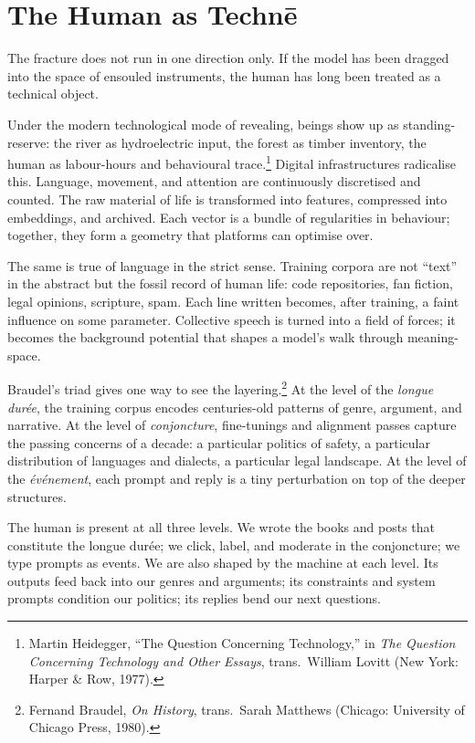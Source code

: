 \documentclass[12pt,a4paper]{article}
\begin{document}
\section{The Human as Techn\={e}}

The fracture does not run in one direction only. If the model has been dragged into the space of ensouled instruments, the human has long been treated as a technical object.

Under the modern technological mode of revealing, beings show up as standing-reserve: the river as hydroelectric input, the forest as timber inventory, the human as labour-hours and behavioural trace.\footnote{Martin Heidegger, ``The Question Concerning Technology,'' in \emph{The Question Concerning Technology and Other Essays}, trans.\ William Lovitt (New York: Harper \& Row, 1977).} Digital infrastructures radicalise this. Language, movement, and attention are continuously discretised and counted. The raw material of life is transformed into features, compressed into embeddings, and archived. Each vector is a bundle of regularities in behaviour; together, they form a geometry that platforms can optimise over.

The same is true of language in the strict sense. Training corpora are not ``text'' in the abstract but the fossil record of human life: code repositories, fan fiction, legal opinions, scripture, spam. Each line written becomes, after training, a faint influence on some parameter. Collective speech is turned into a field of forces; it becomes the background potential that shapes a model's walk through meaning-space.

Braudel's triad gives one way to see the layering.\footnote{Fernand Braudel, \emph{On History}, trans.\ Sarah Matthews (Chicago: University of Chicago Press, 1980).} At the level of the \emph{longue dur\'ee}, the training corpus encodes centuries-old patterns of genre, argument, and narrative. At the level of \emph{conjoncture}, fine-tunings and alignment passes capture the passing concerns of a decade: a particular politics of safety, a particular distribution of languages and dialects, a particular legal landscape. At the level of the \emph{\'ev\'enement}, each prompt and reply is a tiny perturbation on top of the deeper structures.

The human is present at all three levels. We wrote the books and posts that constitute the longue dur\'ee; we click, label, and moderate in the conjoncture; we type prompts as events. We are also shaped by the machine at each level. Its outputs feed back into our genres and arguments; its constraints and system prompts condition our politics; its replies bend our next questions.
\end{document}

